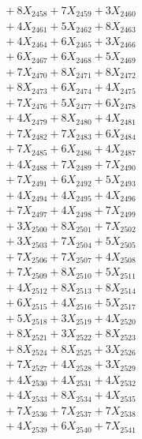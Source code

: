 \documentclass[a4paper,10pt]{article}
\begin{document}
{\begin{align}
&\;  + 8 X_{2458} + 7 X_{2459} + 3 X_{2460} \\[0.3ex]
&\;  + 4 X_{2461} + 5 X_{2462} + 8 X_{2463} \\[0.3ex]
&\;  + 4 X_{2464} + 6 X_{2465} + 3 X_{2466} \\[0.3ex]
&\;  + 6 X_{2467} + 6 X_{2468} + 5 X_{2469} \\[0.5ex]\allowbreak
&\;  + 7 X_{2470} + 8 X_{2471} + 8 X_{2472} \\[0.3ex]
&\;  + 8 X_{2473} + 6 X_{2474} + 4 X_{2475} \\[0.3ex]
&\;  + 7 X_{2476} + 5 X_{2477} + 6 X_{2478} \\[0.3ex]
&\;  + 4 X_{2479} + 8 X_{2480} + 4 X_{2481} \\[0.3ex]
&\;  + 7 X_{2482} + 7 X_{2483} + 6 X_{2484} \\[0.3ex]
&\;  + 7 X_{2485} + 6 X_{2486} + 4 X_{2487} \\[0.3ex]
&\;  + 4 X_{2488} + 7 X_{2489} + 7 X_{2490} \\[0.3ex]
&\;  + 7 X_{2491} + 6 X_{2492} + 5 X_{2493} \\[0.3ex]
&\;  + 4 X_{2494} + 4 X_{2495} + 4 X_{2496} \\[0.3ex]
&\;  + 7 X_{2497} + 4 X_{2498} + 7 X_{2499} \\[0.5ex]\allowbreak
&\;  + 3 X_{2500} + 8 X_{2501} + 7 X_{2502} \\[0.3ex]
&\;  + 3 X_{2503} + 7 X_{2504} + 5 X_{2505} \\[0.3ex]
&\;  + 7 X_{2506} + 7 X_{2507} + 4 X_{2508} \\[0.3ex]
&\;  + 7 X_{2509} + 8 X_{2510} + 5 X_{2511} \\[0.3ex]
&\;  + 4 X_{2512} + 8 X_{2513} + 8 X_{2514} \\[0.3ex]
&\;  + 6 X_{2515} + 4 X_{2516} + 5 X_{2517} \\[0.3ex]
&\;  + 5 X_{2518} + 3 X_{2519} + 4 X_{2520} \\[0.3ex]
&\;  + 8 X_{2521} + 3 X_{2522} + 8 X_{2523} \\[0.3ex]
&\;  + 8 X_{2524} + 8 X_{2525} + 3 X_{2526} \\[0.3ex]
&\;  + 7 X_{2527} + 4 X_{2528} + 3 X_{2529} \\[0.5ex]\allowbreak
&\;  + 4 X_{2530} + 4 X_{2531} + 4 X_{2532} \\[0.3ex]
&\;  + 4 X_{2533} + 8 X_{2534} + 4 X_{2535} \\[0.3ex]
&\;  + 7 X_{2536} + 7 X_{2537} + 7 X_{2538} \\[0.3ex]
&\;  + 4 X_{2539} + 6 X_{2540} + 7 X_{2541} \\[0.3ex]

\end{align}}
\end{document}
